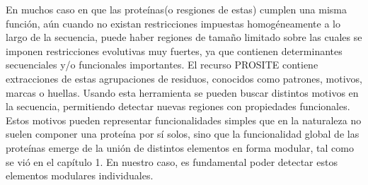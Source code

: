 En muchos caso en que las proteínas(o resgiones de estas) cumplen una misma función, aún cuando no existan restricciones impuestas homogéneamente a lo largo de la secuencia, puede haber regiones de tamaño limitado sobre 
las cuales se imponen restricciones evolutivas muy fuertes, ya que contienen determinantes secuenciales y/o funcionales importantes.
El recurso PROSITE contiene extracciones de estas agrupaciones de residuos, conocidos como patrones, motivos, marcas o huellas.
Usando esta herramienta se pueden buscar distintos motivos en la secuencia, permitiendo detectar nuevas regiones con propiedades funcionales. 
Estos motivos pueden representar funcionalidades simples que en la naturaleza no suelen componer una proteína por sí solos, sino que la funcionalidad global de las proteínas emerge de la unión de distintos elementos en forma modular,
tal como se vió en el capítulo 1. En nuestro caso, es fundamental poder detectar estos elementos modulares individuales.







